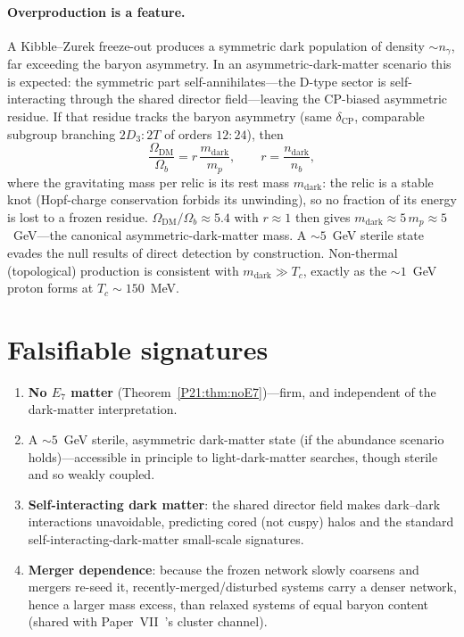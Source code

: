 \documentclass[11pt,a4paper]{article}
\theoremstyle{definition}\newtheorem{definition}[theorem]{Definition}
\theoremstyle{remark}
\newcommand{\twoT}{2T}
\newcommand{\twoD}{2D}
\newcommand{\Odm}{\Omega_{\mathrm{DM}}}
\newcommand{\Ob}{\Omega_{b}}
\begin{document}
\paragraph{Overproduction is a feature.} A Kibble--Zurek freeze-out
produces a symmetric dark population of density $\sim n_\gamma$, far
exceeding the baryon asymmetry. In an asymmetric-dark-matter scenario
this is expected: the symmetric part self-annihilates---the D-type sector
is self-interacting through the shared director field---leaving the
CP-biased asymmetric residue. If that residue tracks the baryon asymmetry
(same $\delta_{\mathrm{CP}}$, comparable subgroup branching
$\twoD_3:\twoT$ of orders $12:24$), then
\begin{equation}
  \frac{\Odm}{\Ob}=r\,\frac{m_{\mathrm{dark}}}{m_p},\qquad
  r=\frac{n_{\mathrm{dark}}}{n_b},
  \label{P21:eq:adm}
\end{equation}
where the gravitating mass per relic is its rest mass $m_{\mathrm{dark}}$:
the relic is a stable knot (Hopf-charge conservation forbids its
unwinding), so no fraction of its energy is lost to a frozen residue.
$\Odm/\Ob\approx5.4$ with $r\approx1$ then gives
$m_{\mathrm{dark}}\approx5\,m_p\approx5$~GeV---the canonical
asymmetric-dark-matter mass. A $\sim5$~GeV sterile state evades the
null results of direct detection by construction. Non-thermal
(topological) production is consistent with $m_{\mathrm{dark}}\gg T_c$,
exactly as the $\sim1$~GeV proton forms at $T_c\sim150$~MeV.

\section{Falsifiable signatures}
\label{P21:sec:signatures}
\begin{enumerate}[noitemsep,label=(\arabic*)]
\item \textbf{No $E_7$ matter} (Theorem~\ref{P21:thm:noE7})---firm, and
independent of the dark-matter interpretation.
\item A $\sim5$~GeV sterile, asymmetric dark-matter state (if the
abundance scenario holds)---accessible in principle to light-dark-matter
searches, though sterile and so weakly coupled.
\item \textbf{Self-interacting dark matter}: the shared director field
makes dark--dark interactions unavoidable, predicting cored (not cuspy)
halos and the standard self-interacting-dark-matter small-scale
signatures.
\item \textbf{Merger dependence}: because the frozen network slowly
coarsens and mergers re-seed it, recently-merged/disturbed systems carry
a denser network, hence a larger mass excess, than relaxed systems of
equal baryon content (shared with Paper~VII~\cite{Paper7}'s cluster
channel).
\end{enumerate}
\end{document}
